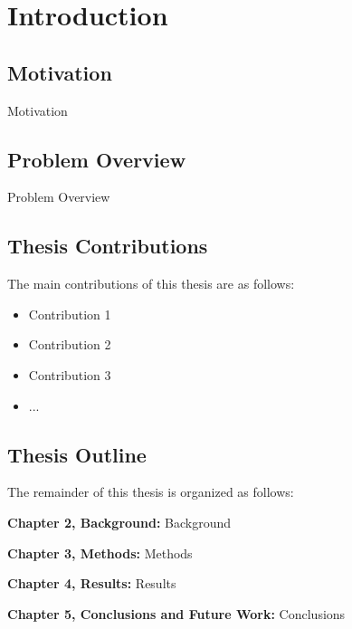 \glsresetall %
\chapter{Introduction}\label{ch:Introduction}

\section{Motivation}
Motivation


\section{Problem Overview}
Problem Overview


\section{Thesis Contributions}

The main contributions of this thesis are as follows:

\begin{itemize}
\item{Contribution 1}
\item{Contribution 2}
\item{Contribution 3}
\item{...}
\end{itemize}


\section{Thesis Outline}
The remainder of this thesis is organized as follows:

\noindent\textbf{Chapter 2, Background:} Background

\noindent\textbf{Chapter 3, Methods:} Methods

\noindent\textbf{Chapter 4, Results:} Results

\noindent\textbf{Chapter 5, Conclusions and Future Work:} Conclusions
